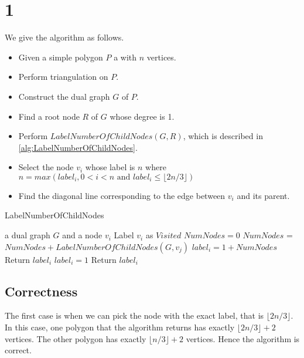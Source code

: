 
\section*{1}
We give the algorithm as follows. \\

\begin{itemize}
    \item Given a simple polygon $P$ a with $n$ vertices.
    \item Perform triangulation on $P$.
    \item Construct the dual graph $G$ of $P$.
    \item Find a root node $R$ of $G$ whose degree is 1.
    \item Perform $LabelNumberOfChildNodes(G,R)$, which is described in 
      \ref{alg:LabelNumberOfChildNodes}.
    \item Select the node $v_i$ whose label is $n$ where $n = max(label_i,0<i<n \text{ and } label_i \leq \lfloor 2n/3\rfloor )$
    \item Find the diagonal line corresponding to the edge between $v_i$ and its parent.
\end{itemize}

\begin{algorithm}[h]
  \caption{LabelNumberOfChildNodes}
  \label{alg:LabelNumberOfChildNodes}
  \begin{algorithmic}
      \Require a dual graph $G$ and a node $v_i$
      \State Label $v_i$ as $Visited$
      \State $NumNodes = 0$
      \State $NumNodes$ = $NumNodes + LabelNumberOfChildNodes(G, v_j)$
      \EndIf
      \EndFor
      \State $label_i = 1 + NumNodes$
      \State Return $label_i$
      \Else
      \State $label_i = 1$
      \State Return $label_i$
      \EndIf
\end{algorithmic}
\end{algorithm}

\subsection*{Correctness}
The first case is when we can pick the node with the exact label, that is $\lfloor2n/3\rfloor$.
In this case, one polygon that the algorithm returns has exactly $\lfloor2n/3\rfloor + 2$ vertices. 
The other polygon has exactly $\lfloor n/3\rfloor + 2$ vertices.
Hence the algorithm is correct. \\

